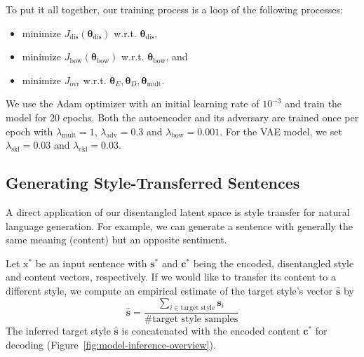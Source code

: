 \documentclass[11pt,a4paper]{article}
\newcommand{\rmx}{\mathrm x}
\newcommand{\loss}[1]{J_\text{#1}}
\begin{document}
To put it all together, our training process is a loop of the following processes:
\begin{itemize}
	\item minimize $\loss{dis}(\bm\theta_\text{dis})$ w.r.t. $\bm\theta_\text{dis}$,
	\item minimize $\loss{bow}(\bm\theta_\text{bow})$ w.r.t. $\bm\theta_\text{bow}$, and
	\item minimize $\loss{ovr}$ w.r.t. $\bm\theta_E, \bm\theta_D, \bm\theta_\text{mult}$.
\end{itemize}

We use the Adam optimizer \cite{kingma2014adam} with an initial learning rate of $10^{-3}$ and train the model for 20 epochs. Both the autoencoder and its adversary are trained once per epoch with $\lambda_\text{mult} = 1$, $\lambda_\text{adv} = 0.3$ and $\lambda_\text{bow} = 0.001$. For the VAE model, we set $\lambda_{\text{skl}} = 0.03$ and $\lambda_{\text{ckl}} = 0.03$.

\subsection{Generating Style-Transferred Sentences} \label{ssec:sentence-generation}

A direct application of our disentangled latent space is style transfer for natural language generation. For example, we can generate a sentence with generally the same meaning (content) but an opposite sentiment.

Let $\rmx^*$ be an input sentence with $\bm s^*$ and $\bm c^*$ being the encoded, disentangled style and content vectors, respectively. If we would like to transfer its content to a different style, we compute an empirical estimate of the target style's vector $\hat{\bm s}$ by
\begin{equation*}
	\hat{\bm s}=\frac{\sum_{i\in\text{target style}}\bm s_i}{\text{\# target style samples}}
\end{equation*}
The inferred target style $\hat{\bm s}$ is concatenated with the encoded content $\bm c^*$ for decoding (Figure~\ref{fig:model-inference-overview}).
\end{document}
